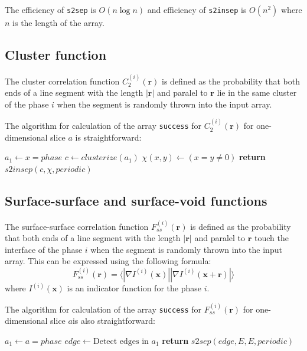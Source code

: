 \documentclass[reprint,amsmath,amssymb,aps,pre]{revtex4-1}
\newcommand{\code}[1]{\colorbox{light-gray}{\texttt{#1}}}
\begin{document}
The efficiency of \code{s2sep} is $O(n\log n)$ and efficiency of
\code{s2insep} is $O(n^2)$ where $n$ is the length of the array.

\subsection{Cluster function}
The cluster correlation function $C_2^{(i)}(\bm{r})$ is defined as the
probability that both ends of a line segment with the length $|\bm{r}|$ and
paralel to $\bm{r}$ lie in the same cluster of the phase $i$ when the segment is
randomly thrown into the input array.

The algorithm for calculation of the array \code{success} for
$C_2^{(i)}(\bm{r})$ for one-dimensional slice $a$ is straightforward:
\begin{algorithmic}[1]
  \State $a_1 \gets x = phase$ 
  \State $c \gets clusterize(a_1)$
  \State $\chi(x,y) \gets (x = y \ne 0)$
  \State \textbf{return} $s2insep(c, \chi, periodic)$
  \EndProcedure
\end{algorithmic}

\subsection{Surface-surface and surface-void functions}
The surface-surface correlation function $F_{ss}^{(i)}(\bm{r})$ is defined as
the probability that both ends of a line segment with the length $|\bm{r}|$ and
paralel to $\bm{r}$ touch the interface of the phase $i$ when the segment is
randomly thrown into the input array. This can be expressed using the following
formula:
\begin{equation*}
  F_{ss}^{(i)}(\bm{r}) = \langle |\nabla I^{(i)}(\bm{x})| |\nabla I^{(i)}(\bm{x}
  + \bm{r})| \rangle
\end{equation*}
where $I^{(i)}(\bm{x})$ is an indicator function for the phase $i$.

The algorithm for calculation of the array \code{success} for
$F_{ss}^{(i)}(\bm{r})$ for one-dimensional slice $a$is also straightforward:
\begin{algorithmic}[1]
    \State $a_1 \gets a = phase$
    \State $edge \gets \text{Detect edges in $a_1$}$
    \State \textbf{return} $s2sep(edge, E, E, periodic)$
  \EndProcedure
\end{algorithmic}
\end{document}
